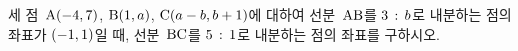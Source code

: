 세 점~$\mathrm{A}(-4{,}\mkern3mu\mathopen{}7)$, $\mathrm{B}(1{,}\mkern3mu\mathopen{}a)$, $\mathrm{C}(a-b{,}\mkern3mu\mathopen{}b+1)$에 대하여 선분~$\mathrm{AB}$를 $3\mkern3mu :\mkern3mu b$로 내분하는 점의 좌표가 $(-1{,}\mkern3mu\mathopen{}1)$일 때, 선분~$\mathrm{BC}$를 $5\mkern3mu :\mkern3mu 1$로 내분하는 점의 좌표를 구하시오.
